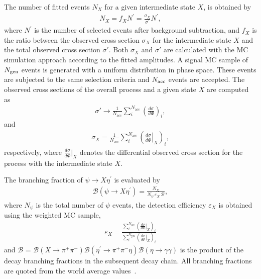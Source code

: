 \documentclass[twocolumn,showpacs,aps,prd]{revtex4-1}
\begin{document}
The number of fitted events $N_X$ for a given intermediate state $X$,
is obtained by
%
\begin{eqnarray}
  \label{xnumber}
  N_X = f_X N^\prime = \frac{\sigma_X}{\sigma^\prime} N^\prime,
\end{eqnarray}
%
where $N^\prime$ is the number of selected events after background subtraction, and $f_X$ is the ratio between the observed cross section $\sigma_{X}$ for the intermediate state $X$ and the total observed cross section $\sigma'$. Both $\sigma_{X}$ and $\sigma'$ are calculated with the MC simulation approach according to the fitted amplitudes. A signal MC sample of $N_{\rm{gen}}$ events is generated with a uniform distribution in phase space. These events
are subjected to the same selection criteria and $N_{\rm{acc}}$ events are accepted. The observed cross sections of the overall process and a given state $X$ are computed as
%
\begin{eqnarray}
  \label{totalsigma}
  \sigma' \rightarrow \frac{1}{N_\text{acc}} \sum_{i}^{N_\text{acc}}\left(\frac{d\sigma}{d\Phi}\right)_{i},
\end{eqnarray}
%
 and
%
\begin{eqnarray}
  \label{xsigma}
  \sigma_{X} = \frac{1}{N_\text{acc}}
  \sum_{i}^{N_\text{acc}} \left(\left.\frac{d\sigma}{d\Phi}\right|_{X}\right)_{i} ,
\end{eqnarray}
respectively, where $\frac{d\sigma}{d\Phi}|_{X}$ denotes the differential observed cross section for the process with the intermediate state $X$.
%

The branching fraction of $\psi \to X\eta^\prime$ is evaluated by
%
\begin{eqnarray}\label{branchingfraction}
  {\mathcal B}(\psi \to X\eta^{\prime}) = \frac{N_X}{N_{\psi} \, \varepsilon_{X}  \, {\mathcal B}},
\end{eqnarray}
%
where $N_\psi$ is the total number of $\psi$ events, the detection efficiency
$\varepsilon_X$ is obtained using the weighted MC sample,
%
\begin{eqnarray}\label{calefficiency}
 \varepsilon_{X} = \frac{ \sum_{i}^{N_\text{acc}} \left(\left.\frac{d\sigma}{d\Phi}\right|_{X}\right)_{i} } { \sum_{i}^{N_\text{gen}} \left(\left.\frac{d\sigma}{d\Phi}\right|_{X}\right)_{i}}
\end{eqnarray}
%
and ${\mathcal B}$ = ${\mathcal B}({X\to \pi^+\pi^-}){\mathcal B}({\eta^\prime\to \pi^+\pi^-\eta})
{\mathcal B}({\eta\to \gamma\gamma})$ is the product of the decay branching fractions in the subsequent decay chain. All branching fractions are quoted from the world average values~\cite{pdg}.
\end{document}
